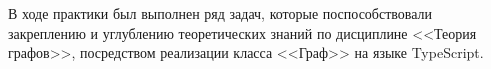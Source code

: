 \documentclass[pract,times]{SCWorks}
\begin{document}








\conclusion
В ходе практики был выполнен ряд задач, которые поспособствовали закреплению
и углублению теоретических знаний по дисциплине <<Теория графов>>, посредством
реализации класса <<Граф>> на языке TypeScript.




\appendix

\end{document}
